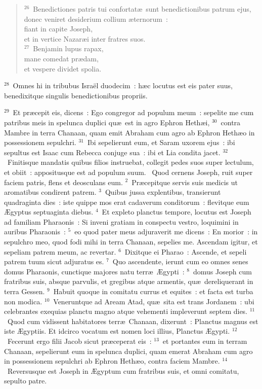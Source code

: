 \begin{flushleft}
\begin{verse}
${}^{26}$~Benedictiones patris tui confortat\ae\ sunt benedictionibus patrum ejus,\\ donec veniret desiderium collium \ae ternorum~:\\ fiant in capite Joseph,\\ et in vertice Nazar\ae i inter fratres suos.\\
${}^{27}$~Benjamin lupus rapax,\\ mane comedat pr\ae dam,\\ et vespere dividet spolia.\end{verse}\end{flushleft}


${}^{28}$~Omnes hi in tribubus Isra\"el duodecim~: h\ae c locutus est eis pater suus, benedixitque singulis benedictionibus propriis.


${}^{29}$~Et pr\ae cepit eis, dicens~: Ego congregor ad populum meum~: sepelite me cum patribus meis in spelunca duplici qu\ae\ est in agro Ephron Heth\ae i,
${}^{30}$~contra Mambre in terra Chanaan, quam emit Abraham cum agro ab Ephron Heth\ae o in possessionem sepulchri.
${}^{31}$~Ibi sepelierunt eum, et Saram uxorem ejus~: ibi sepultus est Isaac cum Rebecca conjuge sua~: ibi et Lia condita jacet.
${}^{32}$~Finitisque mandatis quibus filios instruebat, collegit pedes suos super lectulum, et obiit~: appositusque est ad populum suum.
~Quod cernens Joseph, ruit super faciem patris, flens et deosculans eum.
${}^{2}$~Pr\ae cepitque servis suis medicis ut aromatibus condirent patrem.
${}^{3}$~Quibus jussa explentibus, transierunt quadraginta dies~: iste quippe mos erat cadaverum conditorum~: flevitque eum \AE gyptus septuaginta diebus.
${}^{4}$~Et expleto planctus tempore, locutus est Joseph ad familiam Pharaonis~: Si inveni gratiam in conspectu vestro, loquimini in auribus Pharaonis~:
${}^{5}$~eo quod pater meus adjuraverit me dicens~: En morior~: in sepulchro meo, quod fodi mihi in terra Chanaan, sepelies me. Ascendam igitur, et sepeliam patrem meum, ac revertar.
${}^{6}$~Dixitque ei Pharao~: Ascende, et sepeli patrem tuum sicut adjuratus es.
${}^{7}$~Quo ascendente, ierunt cum eo omnes senes domus Pharaonis, cunctique majores natu terr\ae\ \AE gypti~:
${}^{8}$~domus Joseph cum fratribus suis, absque parvulis, et gregibus atque armentis, qu\ae\ dereliquerant in terra Gessen.
${}^{9}$~Habuit quoque in comitatu currus et equites~: et facta est turba non modica.
${}^{10}$~Veneruntque ad Aream Atad, qu\ae\ sita est trans Jordanem~: ubi celebrantes exequias planctu magno atque vehementi impleverunt septem dies.
${}^{11}$~Quod cum vidissent habitatores terr\ae\ Chanaan, dixerunt~: Planctus magnus est iste \AE gyptiis. Et idcirco vocatum est nomen loci illius, Planctus \AE gypti.
${}^{12}$~Fecerunt ergo filii Jacob sicut pr\ae ceperat eis~:
${}^{13}$~et portantes eum in terram Chanaan, sepelierunt eum in spelunca duplici, quam emerat Abraham cum agro in possessionem sepulchri ab Ephron Heth\ae o, contra faciem Mambre.
${}^{14}$~Reversusque est Joseph in \AE gyptum cum fratribus suis, et omni comitatu, sepulto patre.


